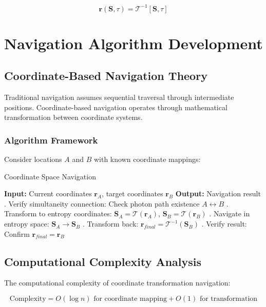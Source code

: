\documentclass[12pt,a4paper]{article}
\begin{document}
\begin{equation}
\mathbf{r}(\mathbf{S}, \tau) = \mathcal{T}^{-1}[\mathbf{S}, \tau]
\label{eq:inverse_transform}
\end{equation}

\section{Navigation Algorithm Development}

\subsection{Coordinate-Based Navigation Theory}

Traditional navigation assumes sequential traversal through intermediate positions. Coordinate-based navigation operates through mathematical transformation between coordinate systems.

\subsubsection{Algorithm Framework}

Consider locations $A$ and $B$ with known coordinate mappings:

\begin{algorithm}[H]
\caption{Coordinate Space Navigation}
\begin{algorithmic}
\State \textbf{Input:} Current coordinates $\mathbf{r}_A$, target coordinates $\mathbf{r}_B$
\State \textbf{Output:} Navigation result
\State 
{}. Verify simultaneity connection: Check photon path existence $A \leftrightarrow B$
. Transform to entropy coordinates: $\mathbf{S}_A = \mathcal{T}(\mathbf{r}_A)$, $\mathbf{S}_B = \mathcal{T}(\mathbf{r}_B)$
. Navigate in entropy space: $\mathbf{S}_A \rightarrow \mathbf{S}_B$
. Transform back: $\mathbf{r}_{final} = \mathcal{T}^{-1}(\mathbf{S}_B)$
. Verify result: Confirm $\mathbf{r}_{final} = \mathbf{r}_B$
\end{algorithmic}
\end{algorithm}

\subsection{Computational Complexity Analysis}

The computational complexity of coordinate transformation navigation:

\begin{equation}
\text{Complexity} = O(\log n) \text{ for coordinate mapping} + O(1) \text{ for transformation}
\label{eq:complexity}
\end{equation}
\end{document}
